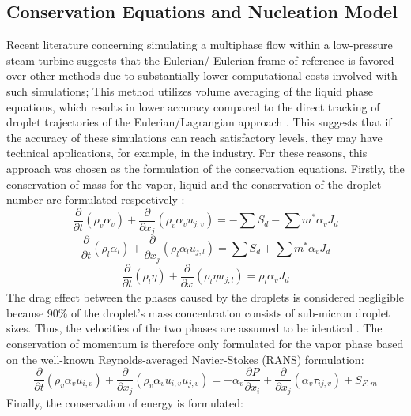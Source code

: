 \documentclass[12pt]{article}
\begin{document}
\subsection{Conservation Equations and Nucleation Model}\label{s:model}
Recent literature concerning simulating a multiphase flow within a low-pressure steam turbine suggests that the Eulerian/ Eulerian frame of reference is favored over other methods due to substantially lower computational costs involved with such simulations; This method utilizes volume averaging of the liquid phase equations, which results in lower accuracy compared to the direct tracking of droplet trajectories of the Eulerian/Lagrangian approach \cite{francesco2017cfd}. This suggests that if the accuracy of these simulations can reach satisfactory levels, they may have technical applications, for example, in the industry. For these reasons, this approach was chosen as the formulation of the conservation equations. Firstly, the conservation of mass for the vapor, liquid and the conservation of the droplet number are formulated respectively \cite{patel2016influence}:
\begin{equation}
    \frac{\partial}{\partial t}(\rho_{v}\alpha_{v})+\frac{\partial}{\partial x_{j}}(\rho_{v}\alpha_{v}u_{j,v}) = -\sum S_{d}-\sum m^{*}\alpha_{v}J_{d}  
    \label{eq:v_conti}
\end{equation}
\begin{equation}
    \frac{\partial}{\partial t}(\rho_{l}\alpha_{l})+\frac{\partial}{\partial x_{j}}(\rho_{l}\alpha_{l}u_{j,l}) = \sum S_{d}+\sum m^{*}\alpha_{v}J_{d}  
    \label{eq:l_conti}
\end{equation}
\begin{equation}
     \frac{\partial}{\partial t}(\rho_{l}\eta)+\frac{\partial}{\partial x_{}}(\rho_{l}\eta u_{j,l}) = \rho_{l}\alpha_{v}J_{d}  
    \label{eq:number_conti}
\end{equation}
The drag effect between the phases caused by the droplets is considered negligible because 90\% of the droplet’s mass concentration consists of sub-micron droplet sizes. Thus, the velocities of the two phases are assumed to be identical \cite{patel2016influence}. The conservation of momentum is therefore only formulated for the vapor phase based on the well-known Reynolds-averaged Navier-Stokes (RANS) formulation:
\begin{equation}
    \frac{\partial}{\partial t}(\rho_{v}\alpha_{v}u_{i,v})+\frac{\partial}{\partial x_{j}}(\rho_{v}\alpha_{v}u_{i,v}u_{j,v}) = -\alpha_{v}\frac{\partial P}{\partial x_{i}}+\frac{\partial}{\partial x_{j}}(\alpha_{v}\tau_{ij,v}) + S_{F,m} 
    \label{eq:v_momentum}
\end{equation}
Finally, the conservation of energy is formulated:
\end{document}
